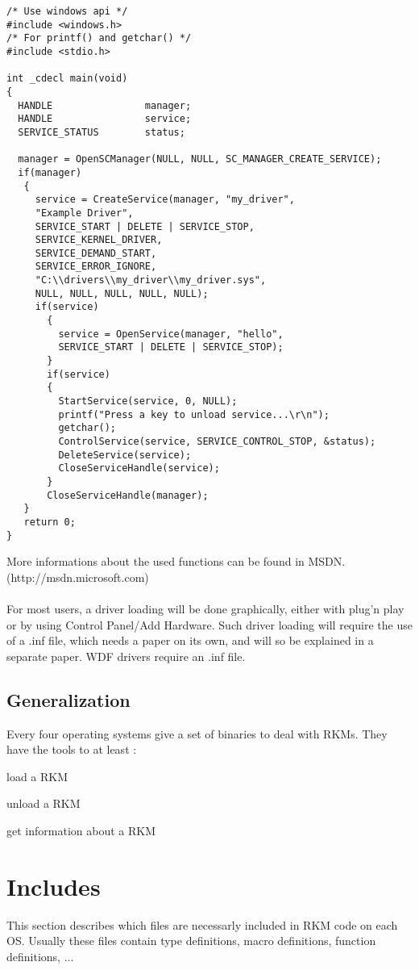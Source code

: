 \documentclass[11pt]{report}
\begin{document}
\begin{lstlisting} 
/* Use windows api */
#include <windows.h>
/* For printf() and getchar() */
#include <stdio.h>

int _cdecl main(void)
{
  HANDLE                manager;
  HANDLE                service;
  SERVICE_STATUS        status;

  manager = OpenSCManager(NULL, NULL, SC_MANAGER_CREATE_SERVICE);
  if(manager)
   {
     service = CreateService(manager, "my_driver",
     "Example Driver",
     SERVICE_START | DELETE | SERVICE_STOP,
     SERVICE_KERNEL_DRIVER,
     SERVICE_DEMAND_START,
     SERVICE_ERROR_IGNORE,
     "C:\\drivers\\my_driver\\my_driver.sys",
     NULL, NULL, NULL, NULL, NULL);
     if(service)
       {
         service = OpenService(manager, "hello",
         SERVICE_START | DELETE | SERVICE_STOP);
       }
       if(service)
       {
         StartService(service, 0, NULL);
         printf("Press a key to unload service...\r\n");
         getchar();
         ControlService(service, SERVICE_CONTROL_STOP, &status);
         DeleteService(service);
         CloseServiceHandle(service);
       }
       CloseServiceHandle(manager);
   }
   return 0;
}
\end{lstlisting}
More informations about the used functions can be found in MSDN.
(http://msdn.microsoft.com)\\
\\
For most users, a driver loading will be done graphically, either
with plug'n play or by using Control Panel/Add Hardware.
Such driver loading will require the use of a .inf file, which needs
a paper on its own, and will so be explained in a separate paper.
WDF drivers require an .inf file.

  \subsection{Generalization}
    Every four operating systems give a set of binaries to deal
    with RKMs. They have the tools to at least :
    \begin{description}
    	\item{load a RKM}
    	\item{unload a RKM}
    	\item{get information about a RKM}
    \end{description}

\newpage
\section{Includes}
This section describes which files are necessarly included in RKM code on each
OS. Usually these files contain type definitions, macro definitions, function
definitions, ...
\end{document}
